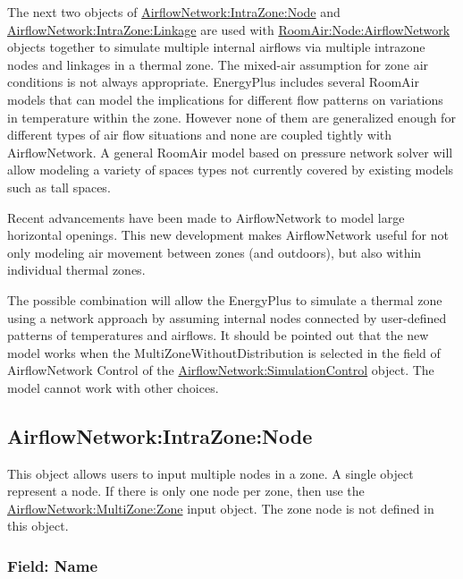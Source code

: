 The next two objects of \hyperref[airflownetworkintrazonenode]{AirflowNetwork:IntraZone:Node} and \hyperref[airflownetworkintrazonelinkage]{AirflowNetwork:IntraZone:Linkage} are used with \hyperref[roomairnodeairflownetwork]{RoomAir:Node:AirflowNetwork} objects together to simulate multiple internal airflows via multiple intrazone nodes and linkages in a thermal zone. The mixed-air assumption for zone air conditions is not always appropriate. EnergyPlus includes several RoomAir models that can model the implications for different flow patterns on variations in temperature within the zone. However none of them are generalized enough for different types of air flow situations and none are coupled tightly with AirflowNetwork. A general RoomAir model based on pressure network solver will allow modeling a variety of spaces types not currently covered by existing models such as tall spaces.

Recent advancements have been made to AirflowNetwork to model large horizontal openings. This new development makes AirflowNetwork useful for not only modeling air movement between zones (and outdoors), but also within individual thermal zones.

The possible combination will allow the EnergyPlus to simulate a thermal zone using a network approach by assuming internal nodes connected by user-defined patterns of temperatures and airflows. It should be pointed out that the new model works when the MultiZoneWithoutDistribution is selected in the field of AirflowNetwork Control of the \hyperref[airflownetworksimulationcontrol]{AirflowNetwork:\hyperref[simulationcontrol]{SimulationControl}} object. The model cannot work with other choices.

\subsection{AirflowNetwork:IntraZone:Node}\label{airflownetworkintrazonenode}

This object allows users to input multiple nodes in a zone. A single object represent a node. If there is only one node per zone, then use the \hyperref[airflownetworkmultizonezone]{AirflowNetwork:MultiZone:Zone} input object. The zone node is not defined in this object.

\subsubsection{Field: Name}\label{field-name-12-000}

